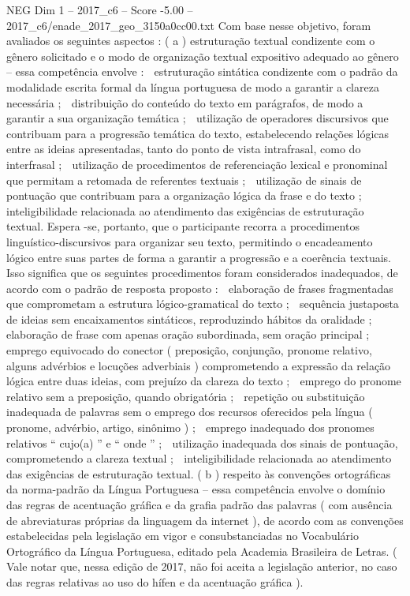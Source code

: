 \begin{textsample}{NEG Dim 1 – 2017\_c6 – Score -5.00 – 2017\_c6/enade\_2017\_geo\_3150a0cc00.txt}
Com base nesse objetivo, foram avaliados os seguintes aspectos : ( a ) estruturação textual condizente com o gênero solicitado e o modo de organização textual expositivo adequado ao gênero – essa competência envolve :  estruturação sintática condizente com o padrão da modalidade escrita formal da língua portuguesa de modo a garantir a clareza necessária ;  distribuição do conteúdo do texto em parágrafos, de modo a garantir a sua organização temática ;  utilização de operadores discursivos que contribuam para a progressão temática do texto, estabelecendo relações lógicas entre as ideias apresentadas, tanto do ponto de vista intrafrasal, como do interfrasal ;  utilização de procedimentos de referenciação lexical e pronominal que permitam a retomada de referentes textuais ;  utilização de sinais de pontuação que contribuam para a organização lógica da frase e do texto ;  inteligibilidade relacionada ao atendimento das exigências de estruturação textual.
Espera -se, portanto, que o participante recorra a procedimentos linguístico-discursivos para organizar seu texto, permitindo o encadeamento lógico entre suas partes de forma a garantir a progressão e a coerência textuais.
Isso significa que os seguintes procedimentos foram considerados inadequados, de acordo com o padrão de resposta proposto :  elaboração de frases fragmentadas que comprometam a estrutura lógico-gramatical do texto ;  sequência justaposta de ideias sem encaixamentos sintáticos, reproduzindo hábitos da oralidade ;  elaboração de frase com apenas oração subordinada, sem oração principal ;  emprego equivocado do conector ( preposição, conjunção, pronome relativo, alguns advérbios e locuções adverbiais ) comprometendo a expressão da relação lógica entre duas ideias, com prejuízo da clareza do texto ;  emprego do pronome relativo sem a preposição, quando obrigatória ;  repetição ou substituição inadequada de palavras sem o emprego dos recursos oferecidos pela língua ( pronome, advérbio, artigo, sinônimo ) ;  emprego inadequado dos pronomes relativos “ cujo(a) ” e “ onde ” ;  utilização inadequada dos sinais de pontuação, comprometendo a clareza textual ;  inteligibilidade relacionada ao atendimento das exigências de estruturação textual. ( b ) respeito às convenções ortográficas da norma-padrão da Língua Portuguesa – essa competência envolve o domínio das regras de acentuação gráfica e da grafia padrão das palavras ( com ausência de abreviaturas próprias da linguagem da internet ), de acordo com as convenções estabelecidas pela legislação em vigor e consubstanciadas no Vocabulário Ortográfico da Língua Portuguesa, editado pela Academia Brasileira de Letras. ( Vale notar que, nessa edição de 2017, não foi aceita a legislação anterior, no caso das regras relativas ao uso do hífen e da acentuação gráfica ).

\end{textsample}
